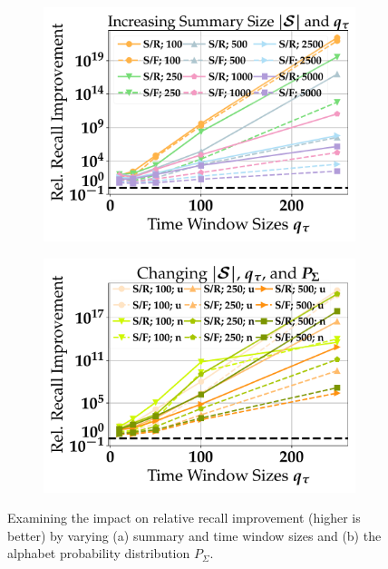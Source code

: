 \setcounter{section}{7}
\setcounter{subsection}{1}
\setcounter{figure}{5}
\begin{figure}[t]
	\centering
	\begin{subfigure}{.39\linewidth}
		\centering
		\includegraphics[width=\linewidth]{revision_plots/summary_time_window_comparison.pdf}
		\vspace{-18pt}
		\caption{}
		\label{plot:summary_size_time_window_size}
	\end{subfigure}
	\hfill
	\begin{subfigure}{.39\linewidth}
		\centering
		\includegraphics[width=\linewidth]{revision_plots/probability_distribution_plot_uni_norm.pdf}
		\vspace{-18pt}
		\caption{}
		\label{plot:different_alphabet_probability_distributions}
	\end{subfigure}

	\vspace{-1em}
	\caption{Examining the impact on relative recall improvement (higher is better) by varying (a) summary and time window sizes and (b) the alphabet probability distribution $P_\Sigma$.}
	\label{fig:summary_size_time_window_size_evaluation_timestamps_query_length}
	\vspace{-1em}
\end{figure}


